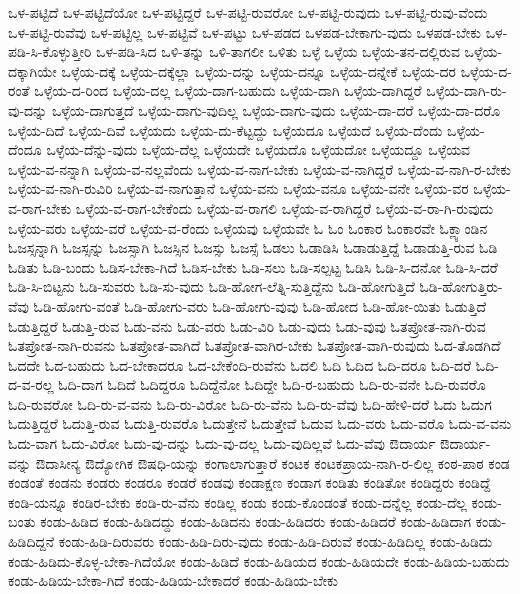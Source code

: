 {ಒಳ-ಪಟ್ಟಿದೆ
ಒಳ-ಪಟ್ಟಿದೆಯೋ
ಒಳ-ಪಟ್ಟಿದ್ದರೆ
ಒಳ-ಪಟ್ಟಿ-ರುವರೋ
ಒಳ-ಪಟ್ಟಿ-ರುವುದು
ಒಳ-ಪಟ್ಟಿ-ರುವು-ವೆಂದು
ಒಳ-ಪಟ್ಟಿ-ರುವೆವು
ಒಳ-ಪಟ್ಟಿಲ್ಲ
ಒಳ-ಪಟ್ಟಿವೆ
ಒಳ-ಪಟ್ಟು
ಒಳ-ಪಡದ
ಒಳಪಡ-ಬೇಕಾಗು-ವುದು
ಒಳಪಡ-ಬೇಕು
ಒಳ-ಪಡಿ-ಸಿ-ಕೊಳ್ಳುತ್ತೀರಿ
ಒಳ-ಪಡಿ-ಸಿದ
ಒಳಿ-ತನ್ನು
ಒಳಿ-ತಾಗಲೀ
ಒಳಿತು
ಒಳ್ಳೆ
ಒಳ್ಳೆಯ
ಒಳ್ಳೆಯ-ತನ-ದಲ್ಲಿರುವ
ಒಳ್ಳೆಯ-ದಕ್ಕಾಗಿಯೇ
ಒಳ್ಳೆಯ-ದಕ್ಕೆ
ಒಳ್ಳೆಯ-ದಕ್ಕೆಲ್ಲಾ
ಒಳ್ಳೆಯ-ದನ್ನು
ಒಳ್ಳೆಯ-ದನ್ನೂ
ಒಳ್ಳೆಯ-ದನ್ನೇಕೆ
ಒಳ್ಳೆಯ-ದರ
ಒಳ್ಳೆಯ-ದ-ರಂತೆ
ಒಳ್ಳೆಯ-ದ-ರಿಂದ
ಒಳ್ಳೆಯ-ದಲ್ಲ
ಒಳ್ಳೆಯ-ದಾಗ-ಬಹುದು
ಒಳ್ಳೆಯ-ದಾಗಿ
ಒಳ್ಳೆಯ-ದಾಗಿದ್ದರೆ
ಒಳ್ಳೆಯ-ದಾಗಿ-ರು-ವು-ದನ್ನು
ಒಳ್ಳೆಯ-ದಾಗುತ್ತದೆ
ಒಳ್ಳೆಯ-ದಾಗು-ವುದಿಲ್ಲ
ಒಳ್ಳೆಯ-ದಾಗು-ವುದು
ಒಳ್ಳೆಯ-ದಾ-ದರೆ
ಒಳ್ಳೆಯ-ದಾ-ದರೊ
ಒಳ್ಳೆಯ-ದಿದೆ
ಒಳ್ಳೆಯ-ದಿವೆ
ಒಳ್ಳೆಯದು
ಒಳ್ಳೆಯ-ದು-ಕೆಟ್ಟದ್ದು
ಒಳ್ಳೆಯದೂ
ಒಳ್ಳೆಯದೆ
ಒಳ್ಳೆಯ-ದೆಂದು
ಒಳ್ಳೆಯ-ದೆಂದೂ
ಒಳ್ಳೆಯ-ದೆನ್ನು-ವುದು
ಒಳ್ಳೆಯ-ದೆಲ್ಲ
ಒಳ್ಳೆಯದೇ
ಒಳ್ಳೆಯದೊ
ಒಳ್ಳೆಯದೋ
ಒಳ್ಳೆಯದ್ದೂ
ಒಳ್ಳೆಯವ
ಒಳ್ಳೆಯ-ವ-ನನ್ನಾಗಿ
ಒಳ್ಳೆಯ-ವ-ನಲ್ಲವೆಂದು
ಒಳ್ಳೆಯ-ವ-ನಾಗ-ಬೇಕು
ಒಳ್ಳೆಯ-ವ-ನಾಗಿದ್ದರೆ
ಒಳ್ಳೆಯ-ವ-ನಾಗಿ-ರ-ಬೇಕು
ಒಳ್ಳೆಯ-ವ-ನಾಗಿ-ರುವಿರಿ
ಒಳ್ಳೆಯ-ವ-ನಾಗುತ್ತಾನೆ
ಒಳ್ಳೆಯ-ವನು
ಒಳ್ಳೆಯ-ವನೂ
ಒಳ್ಳೆಯ-ವನೇ
ಒಳ್ಳೆಯ-ವರ
ಒಳ್ಳೆಯ-ವ-ರಾಗ-ಬೇಕು
ಒಳ್ಳೆಯ-ವ-ರಾಗ-ಬೇಕೆಂದು
ಒಳ್ಳೆಯ-ವ-ರಾಗಲಿ
ಒಳ್ಳೆಯ-ವ-ರಾಗಿದ್ದರೆ
ಒಳ್ಳೆಯ-ವ-ರಾ-ಗಿ-ರುವುದು
ಒಳ್ಳೆಯ-ವರು
ಒಳ್ಳೆಯ-ವರೆ
ಒಳ್ಳೆಯ-ವ-ರೆಂದು
ಒಳ್ಳೆಯವು
ಒಳ್ಳೆಯವೇ
ಓ
ಓಂ
ಓಂಕಾರ
ಓಂಕಾರವೇ
ಓಕ್ಲ್ಯಾಂಡಿನ
ಓಜಸ್ಸನ್ನಾಗಿ
ಓಜಸ್ಸನ್ನು
ಓಜಸ್ಸಾಗಿ
ಓಜಸ್ಸಿನ
ಓಜಸ್ಸು
ಓಜಸ್ಸೆ
ಓಡಲು
ಓಡಾಡಿಸಿ
ಓಡಾಡುತ್ತಿದ್ದೆ
ಓಡಾಡುತ್ತಿ-ರುವ
ಓಡಿ
ಓಡಿತು
ಓಡಿ-ಬಂದು
ಓಡಿಸ-ಬೇಕಾ-ಗಿದೆ
ಓಡಿಸ-ಬೇಕು
ಓಡಿ-ಸಲು
ಓಡಿ-ಸಲ್ಪಟ್ಟ
ಓಡಿಸಿ
ಓಡಿ-ಸಿ-ದನೋ
ಓಡಿ-ಸಿ-ದರೆ
ಓಡಿ-ಸಿ-ಬಿಟ್ಟನು
ಓಡಿ-ಸುವರು
ಓಡಿ-ಸು-ವುದು
ಓಡಿ-ಹೋಗ-ಲೆತ್ನಿ-ಸುತ್ತಿದ್ದೆನು
ಓಡಿ-ಹೋಗುತ್ತಿದೆ
ಓಡಿ-ಹೋಗುತ್ತಿರು-ವೆವು
ಓಡಿ-ಹೋಗು-ವಂತೆ
ಓಡಿ-ಹೋಗು-ವರು
ಓಡಿ-ಹೋಗು-ವುವು
ಓಡಿ-ಹೋದ
ಓಡಿ-ಹೋ-ಯಿತು
ಓಡುತ್ತಿದೆ
ಓಡುತ್ತಿದ್ದರೆ
ಓಡುತ್ತಿ-ರುವ
ಓಡು-ವನು
ಓಡು-ವರು
ಓಡು-ವಿರಿ
ಓಡು-ವುದು
ಓಡು-ವುವು
ಓತಪ್ರೋತ-ನಾಗಿ-ರುವ
ಓತಪ್ರೋತ-ನಾಗಿ-ರುವನು
ಓತಪ್ರೋತ-ವಾಗಿದೆ
ಓತಪ್ರೋತ-ವಾಗಿರ-ಬೇಕು
ಓತಪ್ರೋತ-ವಾಗಿ-ರುವುದು
ಓದ-ತೊಡಗಿದೆ
ಓದದೇ
ಓದ-ಬಹುದು
ಓದ-ಬೇಕಾದರೂ
ಓದ-ಬೇಕೆಂದಿ-ರುವೆನು
ಓದಲಿ
ಓದಿ
ಓದಿದ
ಓದಿ-ದರೂ
ಓದಿ-ದರೆ
ಓದಿ-ದ-ವ-ರಲ್ಲ
ಓದಿ-ದಾಗ
ಓದಿದೆ
ಓದಿದ್ದರೂ
ಓದಿದ್ದೆನೋ
ಓದಿದ್ದೇ
ಓದಿ-ರ-ಬಹುದು
ಓದಿ-ರು-ವನೇ
ಓದಿ-ರುವರೊ
ಓದಿ-ರುವರೋ
ಓದಿ-ರು-ವ-ವನು
ಓದಿ-ರು-ವಿರೋ
ಓದಿ-ರು-ವೆನು
ಓದಿ-ರು-ವೆವು
ಓದಿ-ಹೇಳಿ-ದರೆ
ಓದು
ಓದುಗ
ಓದುತ್ತಿದ್ದರೆ
ಓದುತ್ತಿ-ರುವ
ಓದುತ್ತಿ-ರುವರೊ
ಓದುತ್ತೇನೆ
ಓದುತ್ತೇವೆ
ಓದುವ
ಓದು-ವರು
ಓದು-ವರೊ
ಓದು-ವ-ವನು
ಓದು-ವಾಗ
ಓದು-ವಿರೋ
ಓದು-ವು-ದನ್ನು
ಓದು-ವು-ದಲ್ಲ
ಓದು-ವುದಿಲ್ಲವೆ
ಓದು-ವೆವು
ಔದಾರ್ಯ
ಔದಾರ್ಯ-ವನ್ನು
ಔದಾಸೀನ್ಯ
ಔದ್ಯೋಗಿಕ
ಔಷಧಿ-ಯನ್ನು
ಕಂಗಾಲಾಗುತ್ತಾರೆ
ಕಂಟಕ
ಕಂಟಕಪ್ರಾಯ-ನಾಗಿ-ರ-ಲಿಲ್ಲ
ಕಂಠ-ಪಾಠ
ಕಂಡ
ಕಂಡಂತೆ
ಕಂಡನು
ಕಂಡರು
ಕಂಡರೂ
ಕಂಡರೆ
ಕಂಡವು
ಕಂಡಾಕ್ಷಣ
ಕಂಡಾಗ
ಕಂಡಿತು
ಕಂಡಿತೋ
ಕಂಡಿದ್ದರು
ಕಂಡಿದ್ದೆ
ಕಂಡಿ-ಯನ್ನೂ
ಕಂಡಿರ-ಬೇಕು
ಕಂಡಿ-ರು-ವೆನು
ಕಂಡಿಲ್ಲ
ಕಂಡು
ಕಂಡು-ಕೊಂಡಂತೆ
ಕಂಡು-ದನ್ನೆಲ್ಲ
ಕಂಡು-ದೆಲ್ಲ
ಕಂಡು-ಬಂತು
ಕಂಡು-ಹಿಡಿದ
ಕಂಡು-ಹಿಡಿದದ್ದು
ಕಂಡು-ಹಿಡಿದನು
ಕಂಡು-ಹಿಡಿದರು
ಕಂಡು-ಹಿಡಿದರೆ
ಕಂಡು-ಹಿಡಿದಾಗ
ಕಂಡು-ಹಿಡಿದಿದ್ದನೆ
ಕಂಡು-ಹಿಡಿ-ದಿರುವರು
ಕಂಡು-ಹಿಡಿ-ದಿರು-ವುದು
ಕಂಡು-ಹಿಡಿ-ದಿರುವೆ
ಕಂಡು-ಹಿಡಿದಿಲ್ಲ
ಕಂಡು-ಹಿಡಿದು
ಕಂಡು-ಹಿಡಿದು-ಕೊಳ್ಳ-ಬೇಕಾ-ಗಿದೆಯೋ
ಕಂಡು-ಹಿಡಿದೆ
ಕಂಡು-ಹಿಡಿಯದ
ಕಂಡು-ಹಿಡಿಯದೇ
ಕಂಡು-ಹಿಡಿಯ-ಬಹುದು
ಕಂಡು-ಹಿಡಿಯ-ಬೇಕಾ-ಗಿದೆ
ಕಂಡು-ಹಿಡಿಯ-ಬೇಕಾದರೆ
ಕಂಡು-ಹಿಡಿಯ-ಬೇಕು
}

